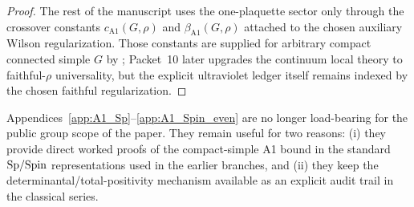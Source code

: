 \begin{proof}
The rest of the manuscript uses the one-plaquette sector only through the crossover constants $c_{\mathrm{A1}}(G,\rho)$ and $\beta_{\mathrm{A1}}(G,\rho)$ attached to the chosen auxiliary Wilson regularization.
Those constants are supplied for arbitrary compact connected simple $G$ by ; Packet~10 later upgrades the continuum local theory to faithful-$\rho$ universality, but the explicit ultraviolet ledger itself remains indexed by the chosen faithful regularization.
\end{proof}

\begin{remark}
Appendices~\ref{app:A1_Sp}--\ref{app:A1_Spin_even} are no longer load-bearing for the public group scope of the paper.
They remain useful for two reasons:
(i) they provide direct worked proofs of the compact-simple A1 bound in the standard $\mathrm{Sp}/\mathrm{Spin}$ representations used in the earlier branches, and
(ii) they keep the determinantal/total-positivity mechanism available as an explicit audit trail in the classical series.
\end{remark}
